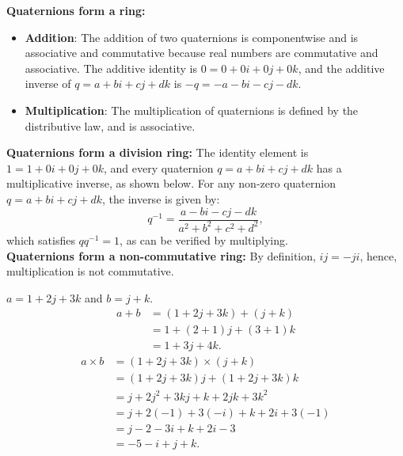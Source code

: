 \begin{explanation}
\textbf{Quaternions form a ring:}

\begin{itemize}
    \item \textbf{Addition}: The addition of two quaternions is componentwise and is associative and commutative because real numbers are commutative and associative. The additive identity is \( 0 = 0 + 0i + 0j + 0k \), and the additive inverse of \( q = a + bi + cj + dk \) is \( -q = -a - bi - cj - dk \).
    \item \textbf{Multiplication}: The multiplication of quaternions is defined by the distributive law, and is associative.
\end{itemize}
\textbf{Quaternions form a division ring:}
The identity element is \( 1 = 1 + 0i + 0j + 0k \), and every quaternion \( q = a + bi + cj + dk \) has a multiplicative inverse, as shown below. For any non-zero quaternion \( q = a + bi + cj + dk \), the inverse is given by:
\[
q^{-1} = \frac{a - bi - cj - dk}{a^2 + b^2 + c^2 + d^2},
\]
which satisfies \( q q^{-1} = 1 \), as can be verified by multiplying.\\
\textbf{Quaternions form a non-commutative ring:}
By definition, $ij = -ji$, hence, multiplication is not commutative.
\end{explanation}
\begin{eg}
    $a = 1 + 2j + 3k$ and $b = j + k$.
    \begin{align*}
        a + b &= (1 + 2j + 3k) + (j + k)\\
              &= 1 + (2+1)j + (3+1)k\\
              &= 1 + 3j + 4k.
    \end{align*}
    \begin{align*}
        a \times b &= (1 + 2j + 3k) \times (j + k)\\
                   &= (1 + 2j + 3k)j + (1 + 2j + 3k)k\\
                   &= j + 2j^2 + 3kj + k + 2jk + 3k^2\\
                   &= j + 2(-1) + 3(-i) + k + 2i + 3(-1)\\
                   &= j -2 -3i + k +2i - 3\\
                   &= -5 - i + j + k.
    \end{align*}
\end{eg}
